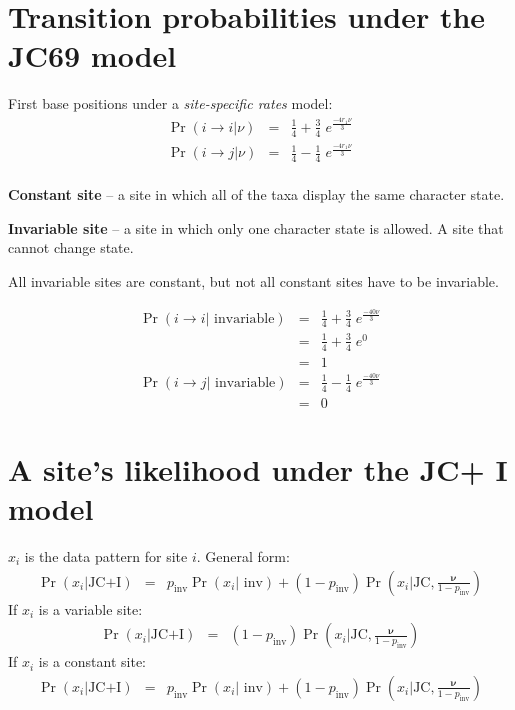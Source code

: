 \documentclass[landscape]{foils}
\begin{document}
\myNewSlide
\section*{Transition probabilities under the JC69 model}
\Large
First base positions under a {\em site-specific rates} model:
\begin{eqnarray*} 
	\Pr(i\rightarrow i | \nu) & = & \frac{1}{4}+\frac{3}{4}\;e^{\frac{-4 r_1\nu}{3}} \\
	\Pr(i\rightarrow j |\nu) & = & \frac{1}{4}-\frac{1}{4}\;e^{\frac{-4r_1\nu}{3}} \\
\end{eqnarray*}

\myNewSlide
 


\myNewSlide
\Large
\begin{compactitem}
	\item {\bf Constant site} -- a site in which all of the taxa display the same character state.
	\item {\bf Invariable site} -- a site in which only one character state is allowed. A site that cannot change state.
\end{compactitem}
All invariable sites are constant, but not all constant sites have to be invariable.


\myNewSlide
	\begin{eqnarray*} 
	\Pr(i\rightarrow i | \mbox{ invariable}) & = & \frac{1}{4}+\frac{3}{4}\;e^{\frac{-4 0\nu}{3}} \\
	 & = & \frac{1}{4}+\frac{3}{4}\;e^0 \\
	 & = & 1 \\
	\Pr(i\rightarrow j | \mbox{ invariable}) & = & \frac{1}{4}-\frac{1}{4}\;e^{\frac{-4 0\nu}{3}} \\
	& = & 0
\end{eqnarray*}

\myNewSlide
\section*{A site's likelihood under the JC+ I model}
\normalsize
$x_i$ is the data pattern for site $i$. General form:
	\begin{eqnarray*} 
		\Pr(x_i|\mbox{JC+I}) & = & p_{\mbox{inv}}\Pr(x_i|\mbox{ inv}) + (1-p_{\mbox{inv}})\Pr\left(x_i|\mbox{JC}, \frac{\bm \nu}{1-p_{\mbox{inv}}}\right)
	 \end{eqnarray*} 	
If $x_i$ is a  variable site:
	\begin{eqnarray*} 
		\Pr(x_i|\mbox{JC+I}) & = & (1-p_{\mbox{inv}})\Pr\left(x_i|\mbox{JC}, \frac{\bm \nu}{1-p_{\mbox{inv}}}\right)
	 \end{eqnarray*} 	
If $x_i$ is a constant site:
	\begin{eqnarray*} 
		\Pr(x_i|\mbox{JC+I}) & = & p_{\mbox{inv}}\Pr(x_i|\mbox{ inv}) + (1-p_{\mbox{inv}})\Pr\left(x_i|\mbox{JC}, \frac{\bm \nu}{1-p_{\mbox{inv}}}\right)
	 \end{eqnarray*} 	
\end{document}
